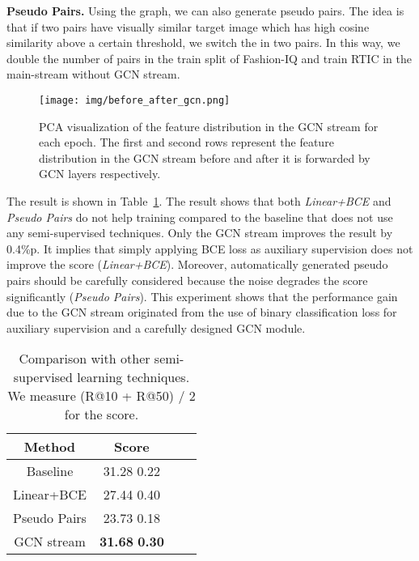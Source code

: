\documentclass[10pt,twocolumn,letterpaper]{article}
\begin{document}
\noindent
\textbf{Pseudo Pairs.} Using the graph, we can also generate pseudo  pairs. The idea is that if two pairs have visually similar target image which has high cosine similarity above a certain threshold, we switch the  in two pairs. In this way, we double the number of  pairs in the train split of Fashion-IQ and train RTIC in the main-stream without GCN stream.

\begin{figure*}[t]
    \begin{center}
	    \texttt{[image: img/before\_after\_gcn.png]}
	\end{center}
	\caption{PCA visualization of the feature distribution in the GCN stream for each epoch. The first and second rows represent the feature distribution in the GCN stream before and after it is forwarded by GCN layers respectively.}
	\label{fig:before_after_gcn}
\end{figure*}

The result is shown in Table~\ref{tab:semi_baseline}. The result shows that both \textit{Linear+BCE} and \textit{Pseudo Pairs} do not help training compared to the baseline that does not use any semi-supervised techniques. Only the GCN stream improves the result by 0.4\%p. It implies that simply applying BCE loss as auxiliary supervision does not improve the score (\textit{Linear+BCE}). Moreover, automatically generated pseudo pairs should be carefully considered because the noise degrades the score significantly (\textit{Pseudo Pairs}). This experiment shows that the performance gain due to the GCN stream originated from the use of binary classification loss for auxiliary supervision and a carefully designed GCN module.

\begin{table}[H]
    \caption{Comparison with other semi-supervised learning techniques. We measure (R@10 + R@50) / 2 for the score.}
    \centering
    \begin{adjustbox}{width=0.26\textwidth}
    \begin{tabular}{cccc}
        \toprule
        Method          & Score \\ \hline \hline
        Baseline        & 31.28  0.22 \\
        Linear+BCE      & 27.44  0.40 \\
        Pseudo Pairs    & 23.73  0.18 \\
        GCN stream      & \textbf{31.68}  \textbf{0.30} \\
        \bottomrule
    \end{tabular}
    \end{adjustbox}
    \label{tab:semi_baseline}
    \end{table}
\end{document}
